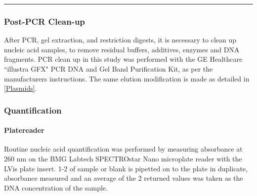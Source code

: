 \hrule
		
	\subsubsection{Post-PCR Clean-up}\label{pcrcleanup}
	After PCR, gel extraction, and restriction digests, it is necessary to clean up nucleic acid samples, to remove residual buffers, additives, enzymes and DNA fragments. PCR clean up in this study was performed with the GE Healthcare ``illustra GFX" PCR DNA and Gel Band Purification Kit, as per the manufacturers instructions. The same elution modification is made as detailed in \vref{Plasmids}.
	
	\subsubsection{Quantification}
	\paragraph{Platereader}
	Routine nucleic acid quantification was performed by measuring absorbance at 260 nm on the BMG Labtech SPECTROstar Nano microplate reader with the LVis plate insert. 1-2\ul{} of sample or blank is pipetted on to the plate in duplicate, absorbance measured and an average of the 2 returned values was taken as the DNA concentration of the sample.
	
%	
